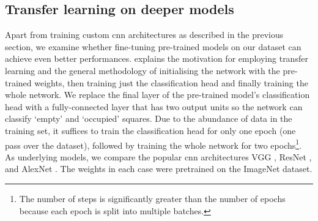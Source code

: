 \documentclass[../main.tex]{subfiles}
\begin{document}
\subsection{Transfer learning on deeper models}
\label{sec:occupancy_transfer_learning}
Apart from training custom \gls{cnn} architectures as described in the previous section, we examine whether fine-tuning pre-trained models on our dataset can achieve even better performances.
 explains the motivation for employing transfer learning and the general methodology of initialising the network with the pre-trained weights, then training just the classification head and finally training the whole network.
We replace the final layer of the pre-trained model's classification head with a fully-connected layer that has two output units so the network can classify `empty' and `occupied' squares.
Due to the abundance of data in the training set, it suffices to train the classification head for only one epoch (one pass over the dataset), followed by training the whole network for two epochs\footnote{The number of steps is significantly greater than the number of epochs because each epoch is split into multiple batches.}.
As underlying models, we compare the popular \gls{cnn} architectures
VGG \cite{simonyan2015},
ResNet \cite{he2016}, and
AlexNet \cite{krizhevsky2017}.
The weights in each case were pretrained on the ImageNet \cite{deng2009} dataset.
\end{document}
